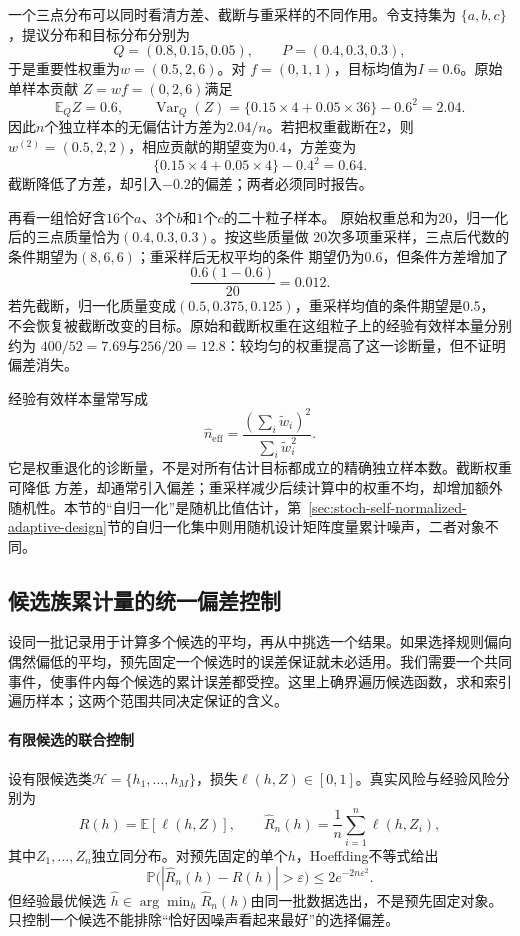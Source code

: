 一个三点分布可以同时看清方差、截断与重采样的不同作用。令支持集为
\(\{a,b,c\}\)，提议分布和目标分布分别为
\[
  Q=(0.8,0.15,0.05),\qquad
  P=(0.4,0.3,0.3),
\]
于是重要性权重为\(w=(0.5,2,6)\)。对
\(f=(0,1,1)\)，目标均值为\(I=0.6\)。原始单样本贡献
\(Z=wf=(0,2,6)\)满足
\[
  \mathbb{E}_Q Z=0.6,\qquad
  \operatorname{Var}_Q(Z)
  =\{0.15\times4+0.05\times36\}-0.6^2
  =2.04.
\]
因此\(n\)个独立样本的无偏估计方差为\(2.04/n\)。若把权重截断在\(2\)，则
\(w^{(2)}=(0.5,2,2)\)，相应贡献的期望变为\(0.4\)，方差变为
\[
  \{0.15\times4+0.05\times4\}-0.4^2=0.64.
\]
截断降低了方差，却引入\(-0.2\)的偏差；两者必须同时报告。

再看一组恰好含\(16\)个\(a\)、\(3\)个\(b\)和\(1\)个\(c\)的二十粒子样本。
原始权重总和为\(20\)，归一化后的三点质量恰为\((0.4,0.3,0.3)\)。按这些质量做
\(20\)次多项重采样，三点后代数的条件期望为\((8,6,6)\)；重采样后无权平均的条件
期望仍为\(0.6\)，但条件方差增加了
\[
  \frac{0.6(1-0.6)}{20}=0.012.
\]
若先截断，归一化质量变成\((0.5,0.375,0.125)\)，重采样均值的条件期望是\(0.5\)，
不会恢复被截断改变的目标。原始和截断权重在这组粒子上的经验有效样本量分别约为
\(400/52=7.69\)与\(256/20=12.8\)：较均匀的权重提高了这一诊断量，但不证明偏差消失。

经验有效样本量常写成
\[ \widehat{n}_{\mathrm{eff}}
  =\frac{(\sum_i\widetilde{w}_i)^2}{\sum_i\widetilde{w}_i^2}. \]
它是权重退化的诊断量，不是对所有估计目标都成立的精确独立样本数。截断权重可降低
方差，却通常引入偏差；重采样减少后续计算中的权重不均，却增加额外随机性。本节的“自归一化”是随机比值估计，第~\ref{sec:stoch-self-normalized-adaptive-design}节的自归一化集中则用随机设计矩阵度量累计噪声，二者对象不同。

\subsection{候选族累计量的统一偏差控制}
\label{sec:probability-uniform-errors-symmetry}
\label{sec:probability-random-functions-uniform-error}
设同一批记录用于计算多个候选的平均，再从中挑选一个结果。如果选择规则偏向偶然偏低的平均，预先固定一个候选时的误差保证就未必适用。我们需要一个共同事件，使事件内每个候选的累计误差都受控。这里上确界遍历候选函数，求和索引遍历样本；这两个范围共同决定保证的含义。

\paragraph{有限候选的联合控制}
设有限候选类\(\mathcal{H}=\{h_1,\ldots,h_M\}\)，损失\(\ell(h,Z)\in[0,1]\)。真实风险与经验风险分别为
\[ R(h)=\mathbb{E}[\ell(h,Z)],
  \qquad\widehat{R}_n(h)=\frac{1}{n}\sum_{i=1}^{n}\ell(h,Z_i), \]
其中\(Z_1,\ldots,Z_n\)独立同分布。对预先固定的单个\(h\)，Hoeffding不等式给出
\[ \mathbb{P}\bigl(
    |\widehat{R}_n(h)-R(h)|>\varepsilon\bigr)\leq 2e^{-2n\varepsilon^2}. \]
但经验最优候选
\(\widehat{h}\in\arg\min_h\widehat{R}_n(h)\)由同一批数据选出，不是预先固定对象。只控制一个候选不能排除“恰好因噪声看起来最好”的选择偏差。

